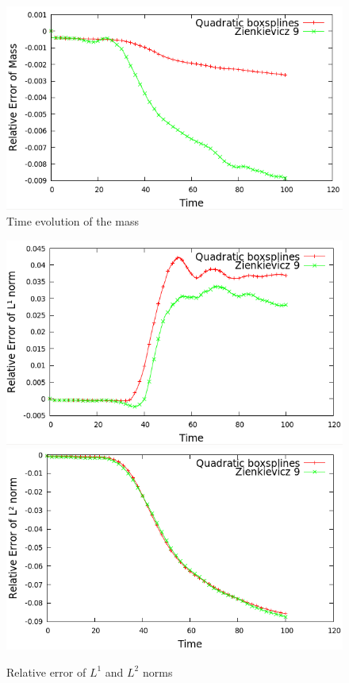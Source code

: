 \documentclass[proc]{edpsmath}
\begin{document}
\begin{figure}[h!]
	\includegraphics[scale=0.4]{figures/Relative_error_of_mass_160.png}
	\caption{Time evolution of the mass}
\end{figure}


\begin{figure}[h!]
	\includegraphics[scale=0.3]{figures/l1norm_160.png}
	\includegraphics[scale=0.3]{figures/l2norm_160.png}
	\caption{Relative error of $L^1$ and $L^2$ norms}
\end{figure}
\end{document}
